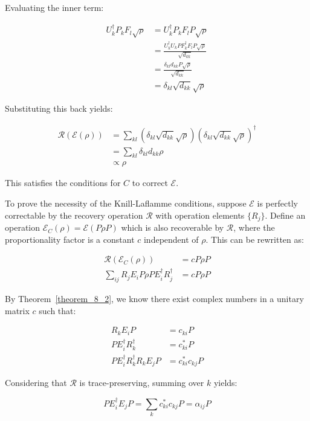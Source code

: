 Evaluating the inner term:

\begin{align*}
U_k^\dagger P_k F_l \sqrt{\rho} &= U_k^\dagger P_k F_l P \sqrt{\rho}\\
&= \frac{U_k^\dagger U_k P F_k^\dagger F_l P \sqrt{\rho}}{\sqrt{d_{kk}}}\\
&= \frac{\delta_{kl} d_{kk} P \sqrt{\rho}}{\sqrt{d_{kk}}}\\
&= \delta_{kl} \sqrt{d_{kk}} \sqrt{\rho}
\end{align*}

Substituting this back yields:

\begin{align*}
\mathcal{R}(\mathcal{E}(\rho)) &=\sum_{kl} \left(\delta_{kl} \sqrt{d_{kk}} \sqrt{\rho}\right) \left(\delta_{kl} \sqrt{d_{kk}} \sqrt{\rho}\right)^\dagger\\
&=\sum_{kl} \delta_{kl} d_{kk} \rho\\
&\propto \rho
\end{align*}

This satisfies the conditions for $C$ to correct $\mathcal{E}$.

To prove the necessity of the Knill-Laflamme conditions, suppose $\mathcal{E}$ is perfectly correctable by the recovery operation $\mathcal{R}$ with operation elements $\{R_j\}$. Define an operation $\mathcal{E}_C (\rho) = \mathcal{E}(P\rho P)$ which is also recoverable by $\mathcal{R}$, where the proportionality factor is a constant $c$ independent of $\rho$. This can be rewritten as:

\begin{align*}
\mathcal{R}(\mathcal{E}_C(\rho)) &= c P\rho P\\
\sum_{ij} R_j E_i P \rho P E^\dagger_i R^\dagger_j &= c P \rho P
\end{align*}

By Theorem~\ref{theorem_8_2}, we know there exist complex numbers in a unitary matrix $c$ such that:

\begin{align*}
R_k E_i P &= c_{ki} P\\
P E_i^\dagger R_k^\dagger &= c_{ki}^* P\\
P E_i^\dagger R_k^\dagger R_k E_j P &= c_{ki}^* c_{kj} P
\end{align*}

Considering that $\mathcal{R}$ is trace-preserving, summing over $k$ yields:

\begin{equation}
P E_i^\dagger E_j P = \sum_k c_{ki}^* c_{kj} P = \alpha_{ij} P
\end{equation}

